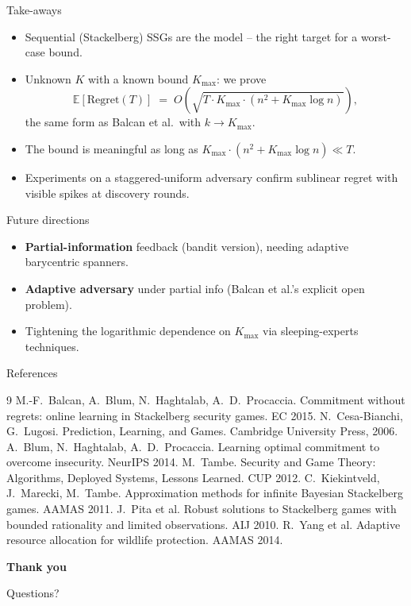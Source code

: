 \documentclass[10pt,aspectratio=169]{beamer}
\newcommand{\impterm}[1]{\textbf{\color{blueprimary}{#1}}}
\newcommand{\Kmax}{K_{\max}}
\newcommand{\EE}{\mathbb{E}}
\begin{document}

\begin{frame}{Take-aways}
\begin{itemize}\small
\item Sequential (Stackelberg) SSGs are the \impterm{harder} model -- the right target for a worst-case bound.
\item Unknown $K$ with a known bound $\Kmax$: we prove
\[
\EE[\mathrm{Regret}(T)]\;=\;O\!\left(\sqrt{T\cdot\Kmax\cdot(n^2+\Kmax\log n)}\right),
\]
the same form as Balcan et al.\ with $k\to\Kmax$.
\item The bound is meaningful as long as $\Kmax\cdot(n^2+\Kmax\log n)\ll T$.
\item Experiments on a staggered-uniform adversary confirm sublinear regret with visible spikes at discovery rounds.
\end{itemize}
\pause
\begin{block}{Future directions}
\begin{itemize}\small
\item \textbf{Partial-information} feedback (bandit version), needing adaptive barycentric spanners.
\item \textbf{Adaptive adversary} under partial info (Balcan et al.'s explicit open problem).
\item Tightening the logarithmic dependence on $\Kmax$ via sleeping-experts techniques.
\end{itemize}
\end{block}
\end{frame}


\begin{frame}[allowframebreaks]{References}
\footnotesize
\begin{thebibliography}{9}
 M.-F.\ Balcan, A.\ Blum, N.\ Haghtalab, A.\ D.\ Procaccia. Commitment without regrets: online learning in Stackelberg security games. EC 2015.
 N.\ Cesa-Bianchi, G.\ Lugosi. Prediction, Learning, and Games. Cambridge University Press, 2006.
 A.\ Blum, N.\ Haghtalab, A.\ D.\ Procaccia. Learning optimal commitment to overcome insecurity. NeurIPS 2014.
 M.\ Tambe. Security and Game Theory: Algorithms, Deployed Systems, Lessons Learned. CUP 2012.
 C.\ Kiekintveld, J.\ Marecki, M.\ Tambe. Approximation methods for infinite Bayesian Stackelberg games. AAMAS 2011.
 J.\ Pita et al. Robust solutions to Stackelberg games with bounded rationality and limited observations. AIJ 2010.
 R.\ Yang et al. Adaptive resource allocation for wildlife protection. AAMAS 2014.
\end{thebibliography}
\end{frame}


\begin{frame}
  \vfill
  \centering
  {\Huge\color{darkgreen}\textbf{Thank you}}\par
  \vspace{0.5em}
  {\large\color{blueprimary}Questions?}
  \vfill
\end{frame}
\end{document}

